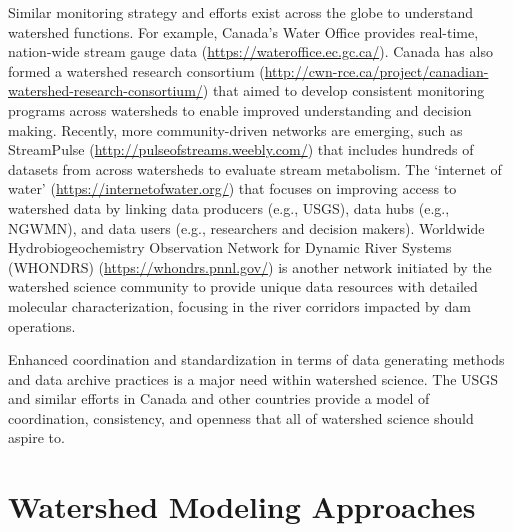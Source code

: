 \documentclass[preprint,review, 12pt]{elsarticle}
\begin{document}
\begin{sloppypar}
Similar monitoring strategy and efforts exist across the globe to understand watershed functions. For example, Canada’s Water Office provides real-time, nation-wide stream gauge data (\url{https://wateroffice.ec.gc.ca/}). Canada has also formed a watershed research consortium (\url{http://cwn-rce.ca/project/canadian-watershed-research-consortium/}) that aimed to develop consistent monitoring programs across watersheds to enable improved understanding and decision making. Recently, more community-driven networks are emerging, such as StreamPulse (\url{http://pulseofstreams.weebly.com/}) that includes hundreds of datasets from across watersheds to evaluate stream metabolism.  The ‘internet of water’ (\url{https://internetofwater.org/}) that focuses on improving access to watershed data by linking data producers (e.g., USGS), data hubs (e.g., NGWMN), and data users (e.g., researchers and decision makers). Worldwide Hydrobiogeochemistry Observation Network for Dynamic River Systems (WHONDRS) (\url{https://whondrs.pnnl.gov/}) is another network initiated by the watershed science community to provide unique data resources with detailed molecular characterization, focusing in the river corridors impacted by dam operations.
\end{sloppypar}

Enhanced coordination and standardization in terms of data generating methods and data archive practices is a major need within watershed science. The USGS and similar efforts in Canada and other countries provide a model of coordination, consistency, and openness that all of watershed science should aspire to.


\section{Watershed Modeling Approaches}
\end{document}
